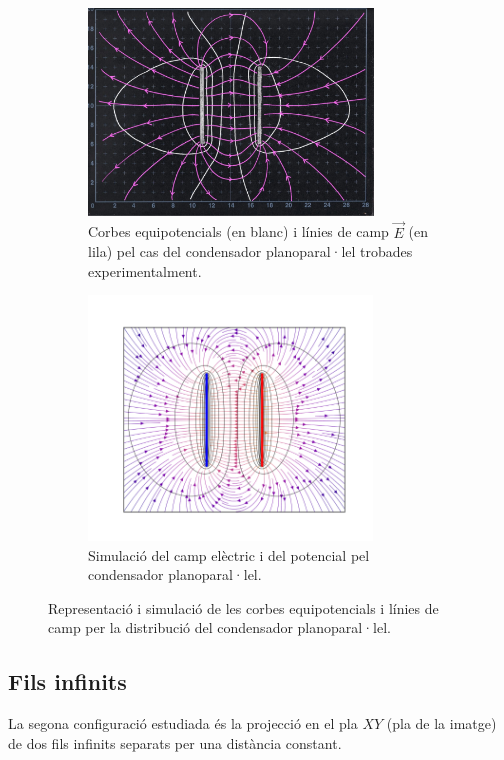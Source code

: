 \documentclass[a4paper,10.5pt]{report}
\begin{document}
\begin{figure}[h]
	\centering
	\begin{subfigure}{0.45\linewidth}
		\centering
		\includegraphics[height=5.5cm]{dibplaques} %
		\caption{Corbes equipotencials (en blanc) i línies de camp $\vec{E}$ (en lila) pel cas del condensador planoparal·lel trobades experimentalment.}
		\label{fig:1.2a}
	\end{subfigure}
	\hfill
	\begin{subfigure}{0.53\linewidth}
		\centering
		\includegraphics[height=6.5cm]{figplaques1} %
		\caption{Simulació del camp elèctric i del potencial pel condensador planoparal·lel.}
		\label{fig:1.2b}
	\end{subfigure}
	\caption{Representació i simulació de les corbes equipotencials i línies de camp per la distribució del condensador planoparal·lel.}
	\label{fig:1.2}
\end{figure}


\subsection{Fils infinits}
La segona configuració estudiada és la projecció en el pla $XY$ (pla de la imatge) de dos fils infinits separats per una distància constant. 
\end{document}
